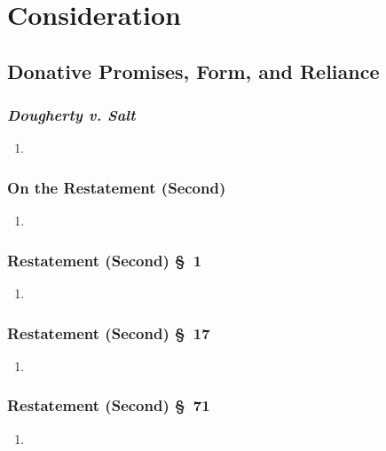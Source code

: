 \section{Consideration}

\subsection{Donative Promises, Form, and Reliance}

\subsubsection{\emph{Dougherty v. Salt}}

\begin{enumerate}
    \item %
\end{enumerate}

\subsubsection{On the Restatement (Second)}

\begin{enumerate}
    \item %
\end{enumerate}

\subsubsection{Restatement (Second) \S\ 1}

\begin{enumerate}
    \item %
\end{enumerate}

\subsubsection{Restatement (Second) \S\ 17}

\begin{enumerate}
    \item %
\end{enumerate}

\subsubsection{Restatement (Second) \S\ 71}

\begin{enumerate}
    \item %
\end{enumerate}

